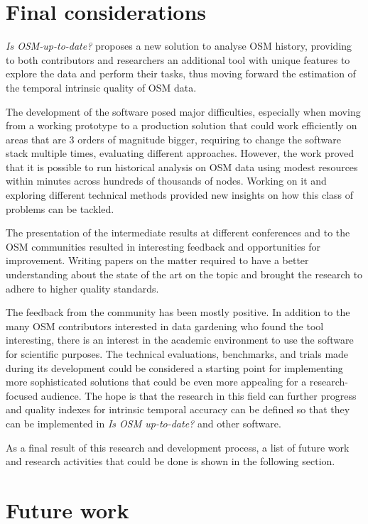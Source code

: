 \documentclass{Configuration_Files/PoliMi3i_thesis}
\begin{document}
\section{Final considerations}

\textit{Is OSM-up-to-date?} proposes a new solution to analyse OSM history, providing to both contributors and researchers an additional tool with unique features to explore the data and perform their tasks, thus moving forward the estimation of the temporal intrinsic quality of OSM data.

The development of the software posed major difficulties, especially when moving from a working prototype to a production solution that could work efficiently on areas that are 3 orders of magnitude bigger, requiring to change the software stack multiple times, evaluating different approaches. However, the work proved that it is possible to run historical analysis on OSM data using modest resources within minutes across hundreds of thousands of nodes. Working on it and exploring different technical methods provided new insights on how this class of problems can be tackled.

The presentation of the intermediate results at different conferences and to the OSM communities resulted in interesting feedback and opportunities for improvement. Writing papers on the matter required to have a better understanding about the state of the art on the topic and brought the research to adhere to higher quality standards.

The feedback from the community has been mostly positive. In addition to the many OSM contributors interested in data gardening who found the tool interesting, there is an interest in the academic environment to use the software for scientific purposes. The technical evaluations, benchmarks, and trials made during its development could be considered a starting point for implementing more sophisticated solutions that could be even more appealing for a research-focused audience. The hope is that the research in this field can further progress and quality indexes for intrinsic temporal accuracy can be defined so that they can be implemented in \textit{Is OSM up-to-date?} and other software.

As a final result of this research and development process, a list of future work and research activities that could be done is shown in the following section.

\section{Future work}
\end{document}
